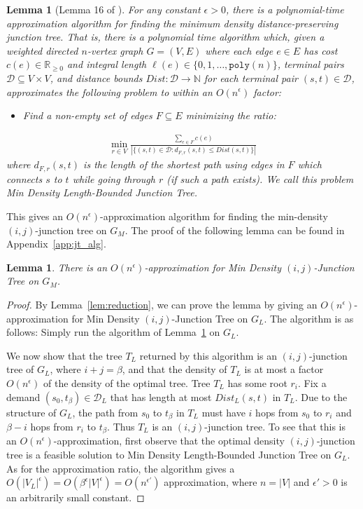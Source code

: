 \documentclass{article}
\newtheorem{lemma}[theorem]{Lemma}
\theoremstyle{definition}
\theoremstyle{remark}
\newcommand{\poly}{\texttt{poly}}
\def\be    {\beta}
\def\jt {{\sc Min Density $(i,j)$-Junction Tree}}
\def\ljt {{\sc Min Density Length-Bounded Junction Tree}}
\begin{document}
\begin{lemma}[Lemma 16 of \cite{GKL23}]
\label{lem:og_JT_alg}
    For any constant $\epsilon > 0$, there is a polynomial-time approximation algorithm for finding the minimum density distance-preserving junction tree. That is, there is a polynomial time algorithm which, given a weighted directed $n$-vertex graph $G = (V,E)$ where each edge $e \in E$ has cost $c(e) \in \mathbb{R}_{\geq 0}$ and integral length $\ell(e) \in \{0,1, \dots, \poly(n)\}$, terminal pairs $\mathcal{D} \subseteq V \times V$, and distance bounds $Dist : \mathcal{D} \rightarrow \mathbb{N}$ for each terminal pair $(s,t) \in \mathcal{D}$, approximates the following problem to within an $O(n^\epsilon)$ factor:
    \begin{itemize}
        \item Find a non-empty set of edges $F \subseteq E$ minimizing the ratio:
    \end{itemize}
    \begin{align*}
        \min_{r \in V} \frac{\sum_{e \in F} c(e)}{|\{(s,t) \in \mathcal{D} : d_{F,r}(s,t) \leq Dist(s,t) \}|}
    \end{align*}
    where $d_{F,r}(s,t)$ is the length of the shortest path using edges in $F$ which connects $s$ to $t$ while going through $r$ (if such a path exists). We call this problem {\ljt}.
\end{lemma}

This gives an $O(n^\epsilon)$-approximation algorithm for finding the min-density $(i,j)$-junction tree on $G_M$. \iflong \else The proof of the following lemma can be found in Appendix~\ref{app:jt_alg}. \fi

\begin{lemma}
\label{lem:hop_JT_approx}
    There is an $O(n^\epsilon)$-approximation for {\jt} on $G_M$.
\end{lemma}
\iflong 
\begin{proof}
    By Lemma~\ref{lem:reduction}, we can prove the lemma by giving an $O(n^\epsilon)$-approximation for {\jt} on $G_L$. The algorithm is as follows: Simply run the algorithm of Lemma~\ref{lem:og_JT_alg} on $G_L$.

    We now show that the tree $T_L$ returned by this algorithm is an $(i,j)$-junction tree of $G_L$, where $i+j = \beta$, and that the density of $T_L$ is at most a factor $O(n^\epsilon)$ of the density of the optimal tree.
    Tree $T_L$ has some root $r_i$.
    Fix a demand $(s_0,t_\beta) \in \mathcal{D}_L$ that has length at most $Dist_L(s,t)$ in $T_L$. Due to the structure of $G_L$, the path from $s_0$ to $t_\be$ in $T_L$ must have $i$ hops from $s_0$ to $r_i$ and $\beta - i$ hops from $r_i$ to $t_\beta$. Thus $T_L$ is an $(i,j)$-junction tree. To see that this is an $O(n^\epsilon)$-approximation, first observe that the optimal density $(i,j)$-junction tree is a feasible solution to {\ljt} on $G_L$. As for the approximation ratio, the algorithm gives a $O(|V_L|^\epsilon) = O(\beta^\epsilon |V|^\epsilon) = O(n^{\epsilon'})$ approximation, where $n = |V|$ and $\epsilon' > 0$ is an arbitrarily small constant.
\end{proof}
\else
\fi
\end{document}
